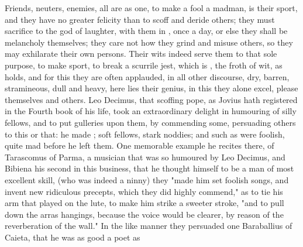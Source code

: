 
Friends, neuters, enemies, all are as one, to make a fool a madman, is their
sport, and they have no greater felicity than to scoff and deride others; they
must sacrifice to the god of laughter, with them in
\Apuleius, once a day, or else they shall be melancholy
themselves; they care not how they grind and misuse others, so they may
exhilarate their own persons. Their wits indeed serve them to that sole
purpose, to make sport, to break a scurrile jest, which is , the froth of wit, as \Tully{} holds, and
for this they are often applauded, in all other discourse, dry, barren,
stramineous, dull and heavy, here lies their genius, in this they alone excel,
please themselves and others. Leo Decimus, that scoffing pope, as Jovius hath
registered in the Fourth book of his life, took an extraordinary delight in
humouring of silly fellows, and to put gulleries upon them,
by commending some, persuading others to this or that: he
made ;
soft fellows, stark noddies; and such as were foolish, quite mad before he left
them. One memorable example he recites there, of Tarascomus of Parma, a
musician that was so humoured by Leo Decimus, and Bibiena his second in this
business, that he thought himself to be a man of most excellent skill, (who was
indeed a ninny) they "made him set foolish songs, and
invent new ridiculous precepts, which they did highly commend," as to tie his
arm that played on the lute, to make him strike a sweeter stroke,
"and to pull down the arras hangings, because the voice
would be clearer, by reason of the reverberation of the wall." In the like
manner they persuaded one Baraballius of Caieta, that he was as good a poet as
